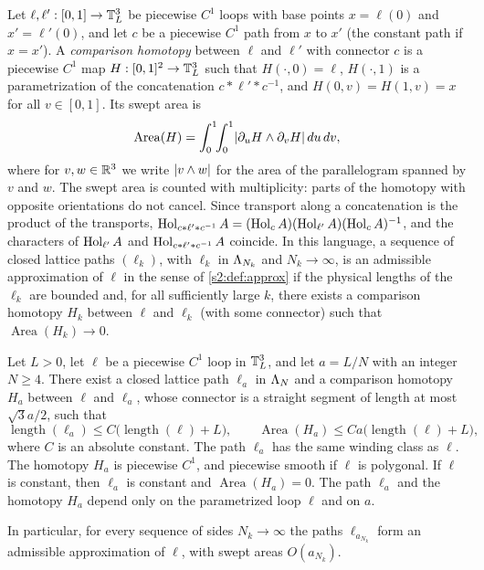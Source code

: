 Let $\ell,\ell':[0,1]\to\mathbb T_L^3$ be piecewise $C^1$ loops with base points $x=\ell(0)$ and $x'=\ell'(0)$, and let $c$ be a piecewise $C^1$ path from $x$ to $x'$ (the constant path if $x=x'$). A \emph{comparison homotopy} between $\ell$ and $\ell'$ with connector $c$ is a piecewise $C^1$ map $H:[0,1]^2\to\mathbb T_L^3$ such that $H(\cdot,0)=\ell$, $H(\cdot,1)$ is a parametrization of the concatenation $c*\ell'*c^{-1}$, and $H(0,v)=H(1,v)=x$ for all $v\in[0,1]$. Its swept area is
\[
 \operatorname{Area}(H)=\int_0^1\!\!\int_0^1\lvert \partial_uH\wedge\partial_vH\rvert\,du\,dv,
\]
where for $v,w\in\mathbb R^3$ we write $\lvert v\wedge w\rvert$ for the area of the parallelogram spanned by $v$ and $w$. The swept area is counted with multiplicity: parts of the homotopy with opposite orientations do not cancel. Since transport along a concatenation is the product of the transports, $\operatorname{Hol}_{c*\ell'*c^{-1}}A=(\operatorname{Hol}_cA)(\operatorname{Hol}_{\ell'}A)(\operatorname{Hol}_cA)^{-1}$, and the characters of $\operatorname{Hol}_{\ell'}A$ and $\operatorname{Hol}_{c*\ell'*c^{-1}}A$ coincide. In this language, a sequence of closed lattice paths $(\ell_k)$, with $\ell_k$ in $\Lambda_{N_k}$ and $N_k\to\infty$, is an admissible approximation of $\ell$ in the sense of \cref{s2:def:approx} if the physical lengths of the $\ell_k$ are bounded and, for all sufficiently large $k$, there exists a comparison homotopy $H_k$ between $\ell$ and $\ell_k$ (with some connector) such that $\operatorname{Area}(H_k)\to0$.

\begin{lemma}\label{ch26:lem:matched-grid-paths}
Let $L>0$, let $\ell$ be a piecewise $C^1$ loop in $\mathbb T_L^3$, and let $a=L/N$ with an integer $N\ge4$. There exist a closed lattice path $\ell_a$ in $\Lambda_{N}$ and a comparison homotopy $H_a$ between $\ell$ and $\ell_a$, whose connector is a straight segment of length at most $\sqrt3a/2$, such that
\begin{equation}\label{ch26:eq:constructed-path-bounds}
 \operatorname{length}(\ell_a)\le C\bigl(\operatorname{length}(\ell)+L\bigr),\qquad \operatorname{Area}(H_a)\le Ca\bigl(\operatorname{length}(\ell)+L\bigr),
\end{equation}
where $C$ is an absolute constant. The path $\ell_a$ has the same winding class as $\ell$. The homotopy $H_a$ is piecewise $C^1$, and piecewise smooth if $\ell$ is polygonal. If $\ell$ is constant, then $\ell_a$ is constant and $\operatorname{Area}(H_a)=0$. The path $\ell_a$ and the homotopy $H_a$ depend only on the parametrized loop $\ell$ and on $a$.
\end{lemma}

In particular, for every sequence of sides $N_k\to\infty$ the paths $\ell_{a_{N_k}}$ form an admissible approximation of $\ell$, with swept areas $O(a_{N_k})$.

